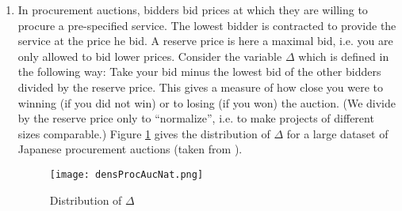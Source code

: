 \documentclass[a4paper,12pt]{article}
\begin{document}
\begin{enumerate}[resume]
    Why would the optimal form of auction depend on the number of licenses? What could have been the motivation of the expert council to suggest different designs for the two cases?\footnote{For more details and an extensive answer to this question, see  \citet[ch. 6]{klemperer2004auctions}.}
  \item In procurement auctions, bidders bid prices at which they are willing to procure a pre-specified service. The lowest bidder is contracted to provide the service at the price he bid. A reserve price is here a maximal bid, i.e. you are only allowed to bid lower prices. Consider the variable $\Delta$ which is defined in the following way: Take your bid minus the lowest bid of the other bidders divided by the reserve price. This gives a measure of how close you were to winning (if you did not win) or to losing (if you won) the auction. (We divide by the reserve price only to ``normalize'', i.e. to make projects of different sizes comparable.) Figure \ref{fig:distProcAucNat} gives the distribution of $\Delta$ for a large dataset of Japanese procurement auctions (taken from \cite{chassang2020robust}). 

    \begin{figure}[h]
      \centering
      \texttt{[image: densProcAucNat.png]}
      \caption{Distribution of $\Delta$}
      \label{fig:distProcAucNat}
    \end{figure}


\end{enumerate}
\end{document}
